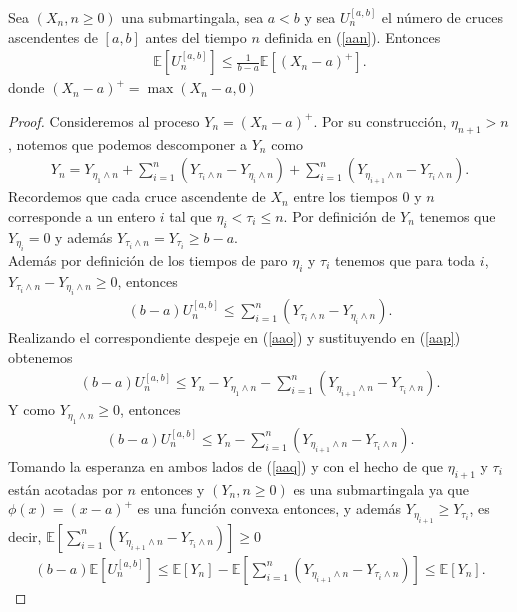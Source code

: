 \begin{theorem}
\label{cruces}
Sea $(X_n, n \geq 0)$ una submartingala, sea $a < b$ y sea $U_n^{[a, b]}$ el número de cruces ascendentes de $[a, b]$ antes del tiempo $n$ definida en (\ref{aan}). Entonces
	\begin{align*}
		\mathbb{E}[U_n^{[a, b]}] \leq \frac{1}{b-a} \mathbb{E}[(X_n - a)^{+}].
	\end{align*}
donde $(X_n - a)^{+} = \max (X_n - a, 0)$
\end{theorem}
\begin{proof}
Consideremos al proceso $Y_n = (X_n - a)^{+}$. Por su construcción, $\eta_{n+1} > n$, notemos que podemos descomponer a $Y_n$ como
	\begin{align}
	Y_n = Y_{\eta_1 \wedge n} + \sum_{i = 1}^n (Y_{\tau_i \wedge n} - Y_{\eta_i \wedge n}) + \sum_{i = 1}^n (Y_{\eta_{i+1} \wedge n} - Y_{\tau_i \wedge n}). \label{aao}
	\end{align}
Recordemos que cada cruce ascendente de $X_n$ entre los tiempos $0$ y $n$ corresponde a un entero $i$ tal que $\eta_i < \tau_i \leq n$. Por definición de $Y_n$ tenemos que $Y_{\eta_i} = 0$ y además $Y_{\tau_i \wedge n} = Y_{\tau_i} \geq b-a$. \\

Además por definición de los tiempos de paro $\eta_i$ y $\tau_i$ tenemos que para toda $i$, $Y_{\tau_i \wedge n} - Y_{\eta_i \wedge n} \geq 0$, entonces
	\begin{align}
	(b - a) U_n^{[a, b]} \leq \sum_{i = 1}^n (Y_{\tau_i \wedge n} - Y_{\eta_i \wedge n}). \label{aap}
	\end{align}
Realizando el correspondiente despeje en (\ref{aao}) y sustituyendo en (\ref{aap}) obtenemos
	\begin{align*}
	(b - a) U_n^{[a, b]} \leq Y_n - Y_{\eta_1 \wedge n} - \sum_{i = 1}^n (Y_{\eta_{i+1} \wedge n} - Y_{\tau_i \wedge n}).
	\end{align*}
Y como $Y_{\eta_1 \wedge n} \geq 0$, entonces
	\begin{align}
	(b - a) U_n^{[a, b]} \leq Y_n - \sum_{i = 1}^n (Y_{\eta_{i+1} \wedge n} - Y_{\tau_i \wedge n}). \label{aaq}
	\end{align}
Tomando la esperanza en ambos lados de (\ref{aaq}) y con el hecho de que $\eta_{i+1}$ y $\tau_i$ están acotadas por $n$ entonces y $(Y_n, n \geq 0)$ es una submartingala ya que $\phi(x) = (x-a)^{+}$ es una función convexa entonces, y además $Y_{\eta_{i+1}} \geq Y_{\tau_i}$, es decir, $\mathbb{E} \left[ \sum_{i = 1}^n (Y_{\eta_{i+1} \wedge n} - Y_{\tau_i \wedge n}) \right] \geq 0$
	\begin{align*}
	(b - a) \mathbb{E}[U_n^{[a, b]}] \leq \mathbb{E}[Y_n] - \mathbb{E} \left[ \sum_{i = 1}^n (Y_{\eta_{i+1} \wedge n} - Y_{\tau_i \wedge n}) \right] \leq \mathbb{E}[Y_n].
	\end{align*}
\end{proof}

